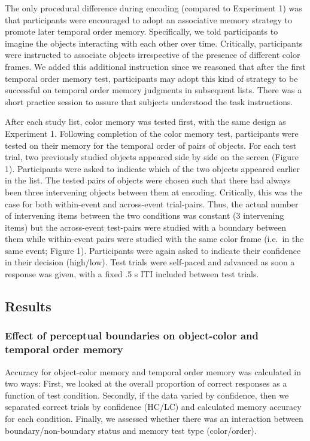 The only procedural difference during encoding (compared to Experiment
1) was that participants were encouraged to adopt an associative memory
strategy to promote later temporal order memory. Specifically, we told
participants to imagine the objects interacting with each other over
time. Critically, participants were instructed to associate objects
irrespective of the presence of different color frames. We added this
additional instruction since we reasoned that after the first temporal
order memory test, participants may adopt this kind of strategy to be
successful on temporal order memory judgments in subsequent lists. There
was a short practice session to assure that subjects understood the task
instructions.

After each study list, color memory was tested first, with the same
design as Experiment 1. Following completion of the color memory test,
participants were tested on their memory for the temporal order of pairs
of objects. For each test trial, two previously studied objects appeared
side by side on the screen (Figure 1). Participants were asked to
indicate which of the two objects appeared earlier in the list. The
tested pairs of objects were chosen such that there had always been
three intervening objects between them at encoding. Critically, this was
the case for both within-event and across-event trial-pairs. Thus, the
actual number of intervening items between the two conditions was
constant (3 intervening items) but the across-event test-pairs were
studied with a boundary between them while within-event pairs were
studied with the same color frame (i.e.~in the same event; Figure 1).
Participants were again asked to indicate their confidence in their
decision (high/low). Test trials were self-paced and advanced as soon a
response was given, with a fixed .5 s ITI included between test trials.

\subsection{Results}\label{results-1}

\subsubsection{Effect of perceptual boundaries on object-color and
temporal order
memory}\label{effect-of-perceptual-boundaries-on-object-color-and-temporal-order-memory}

Accuracy for object-color memory and temporal order memory was
calculated in two ways: First, we looked at the overall proportion of
correct responses as a function of test condition. Secondly, if the data
varied by confidence, then we separated correct trials by confidence
(HC/LC) and calculated memory accuracy for each condition. Finally, we
assessed whether there was an interaction between boundary/non-boundary
status and memory test type (color/order).

